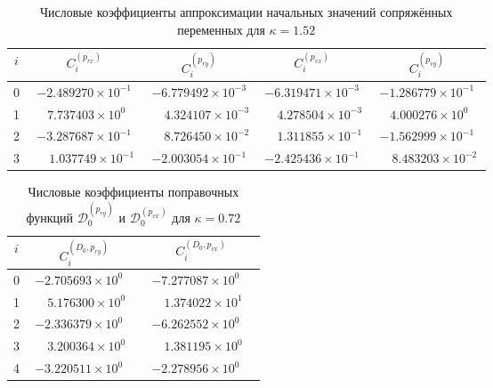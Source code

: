 \begin{table}[htbp]
	\centering
	\caption{Числовые коэффициенты аппроксимации начальных значений сопряжённых переменных для $\kappa = 1.52$}
	\label{tab:appendixB_C_k152}
	\begin{tabular}{|c|c|c|c|c|}
		\hline
		$i$ & $C_i^{(p_{rx})}$ & $C_i^{(p_{ry})}$ & $C_i^{(p_{vx})}$ & $C_i^{(p_{vy})}$ \\
		\hline
		0 & $-2.489270\times10^{-1}$ & $-6.779492\times10^{-3}$ & $-6.319471\times10^{-3}$ & $-1.286779\times10^{-1}$ \\
		1 & $\phantom{-}7.737403\times10^{0\phantom{-}}$ & $\phantom{-}4.324107\times10^{-3}$ & $\phantom{-}4.278504\times10^{-3}$ & $\phantom{-}4.000276\times10^{0\phantom{-}}$ \\
		2 & $-3.287687\times10^{-1}$ & $\phantom{-}8.726450\times10^{-2}$ & $\phantom{-}1.311855\times10^{-1}$ & $-1.562999\times10^{-1}$ \\
		3 & $\phantom{-}1.037749\times10^{-1}$ & $-2.003054\times10^{-1}$ & $-2.425436\times10^{-1}$ & $\phantom{-}8.483203\times10^{-2}$ \\
		\hline
	\end{tabular}
\end{table}

\begin{table}[htbp]
	\centering
	\caption{Числовые коэффициенты поправочных функций $\mathcal D_0^{(p_{ry})}$ и $\mathcal D_0^{(p_{vx})}$ для $\kappa = 0.72$}
	\label{tab:appendixB_D_pair1_k072}
	\begin{tabular}{|c|c|c|}
		\hline
		$i$ & $C_i^{(D_0,p_{ry})}$ & $C_i^{(D_0,p_{vx})}$ \\
		\hline
		0 & $-2.705693\times10^{0\phantom{-}}$ & $-7.277087\times10^{0\phantom{-}}$ \\
		1 & $\phantom{-}5.176300\times10^{0\phantom{-}}$ & $\phantom{-}1.374022\times10^{1\phantom{-}}$ \\
		2 & $-2.336379\times10^{0\phantom{-}}$ & $-6.262552\times10^{0\phantom{-}}$ \\
		3 & $\phantom{-}3.200364\times10^{0\phantom{-}}$ & $\phantom{-}1.381195\times10^{0\phantom{-}}$ \\
		4 & $-3.220511\times10^{0\phantom{-}}$ & $-2.278956\times10^{0\phantom{-}}$ \\
		\hline
	\end{tabular}
\end{table}

